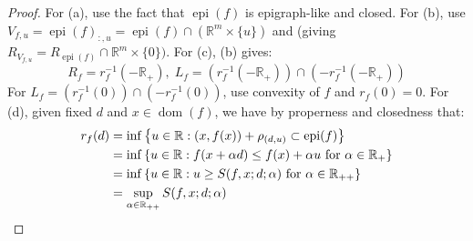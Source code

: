 \begin{proof}
	For (a), use the fact that $\operatorname{epi}(f)$ is epigraph-like and closed.	For (b), use $V_{f,u}=\operatorname{epi}(f)_{:,u}=\operatorname{epi}(f)\cap \left(\mathbb{R}^m\times \{u\}\right)$ and  (giving $R_{V_{f,u}}=R_{\operatorname{epi}(f)}\cap \mathbb{R}^m\times\{0\})$. For (c), (b) gives:
		\[
			R_f=r_f^{-1}\left(-\mathbb{R}_{+}\right),\;
			L_f=\left(r_f^{-1}\left(-\mathbb{R}_{+}\right)\right)\cap\left(-r_f^{-1}(-\mathbb{R}_{+})\right)
		\]
		For $L_f=\left(r_f^{-1}(0)\right)\cap\left(-r_f^{-1}(0)\right)$, use convexity of $f$ and $r_f(0)=0$. For (d), given fixed $d$ and $x\in \operatorname{dom}(f)$, we have by properness and closedness that:
	\begin{align*}
		r_f(d) & =\inf \left\{u\in \mathbb{R}:(x,f(x))+\rho_{(d,u)}\subset \operatorname{epi}(f)\right\}                  \\
		       & = \inf \left\{u\in \mathbb{R}:f(x+\alpha d)\leq f(x)+\alpha u\text{ for }\alpha \in \mathbb{R}_+\right\} \\
		       & = \inf \left\{u\in \mathbb{R}:u\geq S(f,x; d; \alpha)\text{ for }\alpha \in \mathbb{R}_{++}\right\}      \\
		       & = \sup_{\alpha \in \mathbb{R}_{++}} S(f,x; d; \alpha)\qedhere{}
	\end{align*}
\end{proof}


